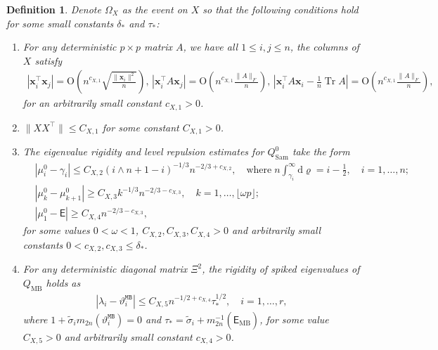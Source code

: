 \documentclass[10pt,a4paper]{amsart}
\newtheorem{definition}{Definition}
\begin{document}
\begin{definition}\label{def_OmegaX}
	Denote $\Omega_X$ as the event on $X$ so that the following conditions hold for some small constants $\delta_*$ and $\tau_*$:
	\begin{enumerate}
		\setlength{\itemsep}{0.3em}
		\setlength{\parsep}{0pt}
		\setlength{\topsep}{0.3em}
		\setlength{\labelsep}{0.6em}
		\item [(1)] For any deterministic $p\times p$ matrix $A$, we have all $1\leq i,j\leq n$, the columns of $X$ satisfy
		\begin{align*}
			|\mathbf{x}_i^\top \mathbf{x}_j|=\mathrm{O}\left(n^{c_{X,1}}\sqrt{\frac{\|\mathbf{x}_i\|^2}{n}}\right), \, |\mathbf{x}_i^\top A\mathbf{x}_j|=\mathrm{O}\left(n^{c_{X,1}}\frac{\|A\|_F}{n}\right),\,|\mathbf{x}_i^\top A\mathbf{x}_i-\frac{1}{n}\operatorname{Tr}A|=\mathrm{O}\left(n^{c_{X,1}}\frac{\|A\|_F}{n}\right),
		\end{align*}
		for an arbitrarily small constant $c_{X,1}>0$.
		\item [(2)] $\|XX^\top\|\leq C_{X,1}$ for some constant $C_{X,1}>0$.
		\item [(3)] The eigenvalue rigidity and level repulsion estimates for $Q_{\mathrm{Sam}}^0$ take the form
		\begin{align*}
			&|\mu^0_i-\gamma_i|\leq C_{X,2}(i\wedge n+1-i)^{-1/3}n^{-2/3+c_{X,2}},\quad \text{where}\; n\int_{\gamma_i}^{\infty}\mathrm{d}\varrho=i-\frac{1}{2},\quad i=1,\dots,n;\\
			&|\mu^0_k-\mu^0_{k+1}|\geq C_{X,3}k^{-1/3}n^{-2/3-c_{X,3}}, \quad k=1,\dots, \lfloor \omega p \rfloor;\\
			&|\mu^0_1-\mathsf{E}|\geq C_{X,4} n^{-2/3-c_{X,3}},
		\end{align*}
		for some values $0<\omega<1$, $C_{X,2},C_{X,3},C_{X,4}>0$ and arbitrarily small constants $0<c_{X,2},c_{X,3}\le\delta_*$.
		\item [(4)] For any deterministic diagonal matrix $\Xi^2$, the rigidity of spiked eigenvalues of $Q_{\mathrm{MB}}$ holds as 
		\begin{align*}
			|\lambda_i-\vartheta^{\mathtt{MB}}_i|\le C_{X,5}n^{-1/2+c_{X,4}}\tau_{*}^{1/2},\quad i=1,\dots,r,
		\end{align*}
		where $1+\widetilde{\sigma}_im_{2n}(\vartheta^{\mathtt{MB}}_i)=0$ and $\tau_{*}=\widetilde{\sigma}_i+m_{2n}^{-1}(\widehat{\mathsf{E}}_{\mathrm{MB}})$,
		for some value $C_{X,5}>0$ and arbitrarily small constant $c_{X,4}>0$.
	\end{enumerate}
\end{definition}
\end{document}
